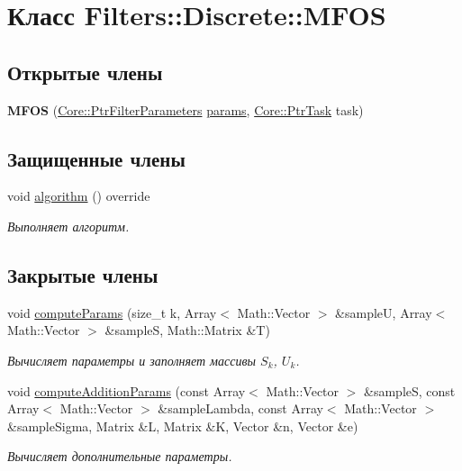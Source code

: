 \hypertarget{class_filters_1_1_discrete_1_1_m_f_o_s}{}\section{Класс Filters\+:\+:Discrete\+:\+:M\+F\+OS}
\label{class_filters_1_1_discrete_1_1_m_f_o_s}
\subsection*{Открытые члены}
\begin{DoxyCompactItemize}
\item 
{\bfseries M\+F\+OS} (\hyperlink{namespace_core_a4811af8148ba137d644b9a61a042cf03}{Core\+::\+Ptr\+Filter\+Parameters} \hyperlink{class_core_1_1_filter_a44aa749b49ba46256975ce545531ecf7}{params}, \hyperlink{namespace_core_abfda8f69fcacfcea2696549b548ed737}{Core\+::\+Ptr\+Task} task)\hypertarget{class_filters_1_1_discrete_1_1_m_f_o_s_a91cdbd25622c39f50c99f601aad6c238}{}\label{class_filters_1_1_discrete_1_1_m_f_o_s_a91cdbd25622c39f50c99f601aad6c238}

\end{DoxyCompactItemize}
\subsection*{Защищенные члены}
\begin{DoxyCompactItemize}
\item 
void \hyperlink{class_filters_1_1_discrete_1_1_m_f_o_s_a88e35ad4500d57e81be035959ab9bb5c}{algorithm} () override
\begin{DoxyCompactList}\small\item\em Выполняет алгоритм. \end{DoxyCompactList}\end{DoxyCompactItemize}
\subsection*{Закрытые члены}
\begin{DoxyCompactItemize}
\item 
void \hyperlink{class_filters_1_1_discrete_1_1_m_f_o_s_afb92a54a0aa1a7ecdcf527095849d123}{compute\+Params} (size\+\_\+t k, Array$<$ Math\+::\+Vector $>$ \&sampleU, Array$<$ Math\+::\+Vector $>$ \&sampleS, Math\+::\+Matrix \&T)
\begin{DoxyCompactList}\small\item\em Вычисляет параметры и заполняет массивы $S_{k}$, $U_k$. \end{DoxyCompactList}\item 
void \hyperlink{class_filters_1_1_discrete_1_1_m_f_o_s_a0d4feb8bdd7bc3ec30a31df3ca4e13d6}{compute\+Addition\+Params} (const Array$<$ Math\+::\+Vector $>$ \&sampleS, const Array$<$ Math\+::\+Vector $>$ \&sample\+Lambda, const Array$<$ Math\+::\+Vector $>$ \&sample\+Sigma, Matrix \&L, Matrix \&K, Vector \&n, Vector \&e)
\begin{DoxyCompactList}\small\item\em Вычисляет дополнительные параметры. \end{DoxyCompactList}\end{DoxyCompactItemize}

